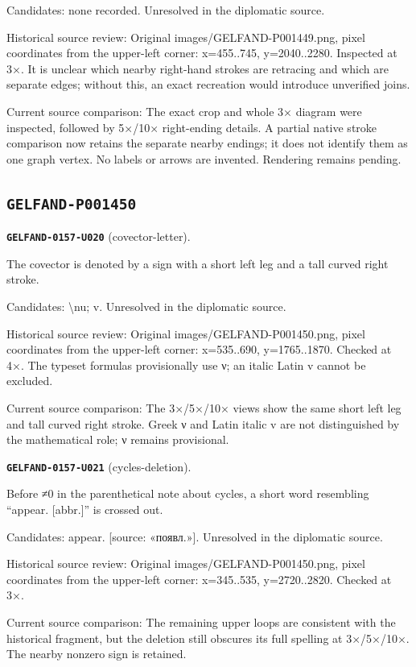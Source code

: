 Candidates: none recorded. Unresolved in the diplomatic source.\par
Historical source review: Original images/GELFAND-P001449.png, pixel coordinates from the upper-left corner: x=455..745, y=2040..2280. Inspected at 3×. It is unclear which nearby right-hand strokes are retracing and which are separate edges; without this, an exact recreation would introduce unverified joins.\par
Current source comparison: The exact crop and whole 3× diagram were inspected, followed by 5×/10× right-ending details. A partial native stroke comparison now retains the separate nearby endings; it does not identify them as one graph vertex. No labels or arrows are invented. Rendering remains pending.\par\medskip
\subsection*{\texttt{GELFAND-P001450}}
\par\noindent\leavevmode{}\label{GELFAND-0157-U020}\label{GELFAND-P001450:covector-letter}\textbf{\texttt{GELFAND-0157-U020}} (covector-letter).\nopagebreak[4]\par
The covector is denoted by a sign with a short left leg and a tall curved right stroke.\par
Candidates: \textbackslash{}nu; v. Unresolved in the diplomatic source.\par
Historical source review: Original images/GELFAND-P001450.png, pixel coordinates from the upper-left corner: x=535..690, y=1765..1870. Checked at 4×. The typeset formulas provisionally use ν; an italic Latin v cannot be excluded.\par
Current source comparison: The 3×/5×/10× views show the same short left leg and tall curved right stroke. Greek ν and Latin italic v are not distinguished by the mathematical role; ν remains provisional.\par\medskip
\par\noindent\leavevmode{}\label{GELFAND-0157-U021}\label{GELFAND-P001450:cycles-deletion}\textbf{\texttt{GELFAND-0157-U021}} (cycles-deletion).\nopagebreak[4]\par
Before ≠0 in the parenthetical note about cycles, a short word resembling “appear. [abbr.]” is crossed out.\par
Candidates: appear. [source: «появл.»]. Unresolved in the diplomatic source.\par
Historical source review: Original images/GELFAND-P001450.png, pixel coordinates from the upper-left corner: x=345..535, y=2720..2820. Checked at 3×.\par
Current source comparison: The remaining upper loops are consistent with the historical fragment, but the deletion still obscures its full spelling at 3×/5×/10×. The nearby nonzero sign is retained.\par\medskip
